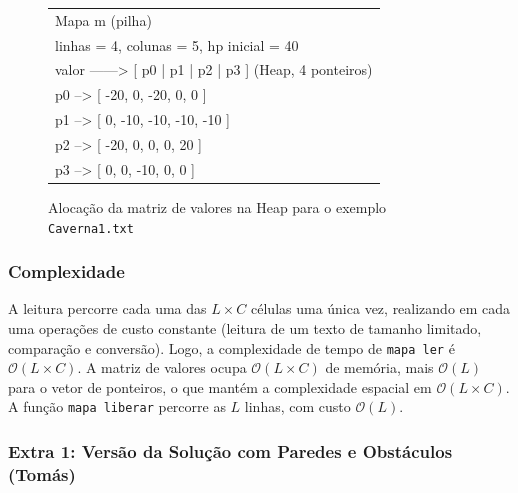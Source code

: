 \documentclass[12pt,a4paper]{article}
\makeatletter
\DeclareRobustCommand{\_}{%
  \ifmmode
    \nfss@text{\textunderscore}%
  \else
    \textunderscore\allowbreak
  \fi
}
\makeatother
\begin{document}
\begin{figure}[htbp]
    \centering
    \begin{minipage}{0.7\textwidth}
        \ttfamily\small
        \begin{tabular}{|l|}
        \hline
        Mapa m (pilha) \\
        \quad linhas = 4, colunas = 5, hp\_inicial = 40 \\
        \quad valor ------> [ p0 | p1 | p2 | p3 ]   (Heap, 4 ponteiros) \\
        \quad \quad \quad \quad \quad \quad \quad  p0 --> [ -20, 0, -20, 0, 0 ] \\
        \quad \quad \quad \quad \quad \quad \quad  p1 --> [ 0, -10, -10, -10, -10 ] \\
        \quad \quad \quad \quad \quad \quad \quad  p2 --> [ -20, 0, 0, 0, 20 ] \\
        \quad \quad \quad \quad \quad \quad \quad  p3 --> [ 0, 0, -10, 0, 0 ] \\
        \hline
        \end{tabular}
    \end{minipage}
    \vspace{0.2cm}
    \caption{Alocação da matriz de valores na Heap para o exemplo \texttt{Caverna1.txt}}
    \label{fig:memoria}
\end{figure}
 
\subsubsection*{Complexidade}
 
A leitura percorre cada uma das $L \times C$ células uma única vez, realizando em cada uma operações de custo constante (leitura de um texto de tamanho limitado, comparação e conversão). Logo, a complexidade de tempo de \texttt{mapa\_ler} é $\mathcal{O}(L \times C)$. A matriz de valores ocupa $\mathcal{O}(L \times C)$ de memória, mais $\mathcal{O}(L)$ para o vetor de ponteiros, o que mantém a complexidade espacial em $\mathcal{O}(L \times C)$. A função \texttt{mapa\_liberar} percorre as $L$ linhas, com custo $\mathcal{O}(L)$.
 
\subsubsection*{Extra 1: Versão da Solução com Paredes e Obstáculos (Tomás)}
\end{document}
